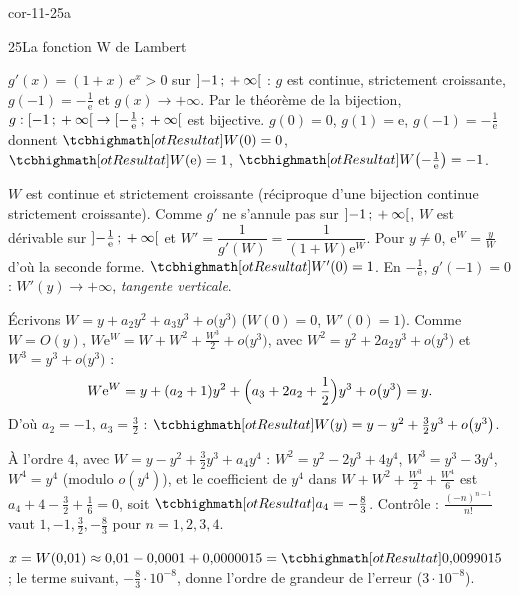 
\begin{blocLivre}{cor-11-25a}
\begin{corrige}{25}{La fonction W de Lambert}
\begin{questions}
  \item $g'(x)=(1+x)\,\mathrm{e}^{x}>0$ sur $\mathopen{]}-1\,{;}\,+\infty\mathclose{[}$ : $g$ est
    continue, strictement croissante, $g(-1)=-\frac1{\mathrm{e}}$ et
    $g(x)\to+\infty$. Par le théorème de la bijection,
    $g:\mathopen{[}-1\,{;}\,+\infty\mathclose{[}\to\mathopen{[}-\frac1{\mathrm{e}}\,{;}\,+\infty\mathclose{[}$ est
    bijective. $g(0)=0$, $g(1)=\mathrm{e}$, $g(-1)=-\frac1{\mathrm{e}}$
    donnent $\res{W(0)=0}$, $\res{W(\mathrm{e})=1}$,
    $\res{W\bigl(-\tfrac1{\mathrm{e}}\bigr)=-1}$.
  \item $W$ est continue et strictement croissante (réciproque d'une
    bijection continue strictement croissante). Comme $g'$ ne s'annule pas
    sur $\mathopen{]}-1\,{;}\,+\infty\mathclose{[}$, $W$ est dérivable sur
    $\mathopen{]}-\frac1{\mathrm{e}}\,{;}\,+\infty\mathclose{[}$ et
    $W'=\dfrac{1}{g'(W)}=\dfrac{1}{(1+W)\mathrm{e}^{W}}$. Pour $y\neq0$,
    $\mathrm{e}^{W}=\frac yW$ d'où la seconde forme. $\res{W'(0)=1}$. En
    $-\frac1{\mathrm{e}}$, $g'(-1)=0$ : $W'(y)\to+\infty$, \emph{tangente
    verticale}.
\end{questions}
\begin{questions}[resume]
  \item Écrivons $W=y+a_2y^{2}+a_3y^{3}+o\bigl(y^{3}\bigr)$ ($W(0)=0$,
    $W'(0)=1$). Comme $W=O(y)$,
    $W\mathrm{e}^{W}=W+W^{2}+\frac{W^{3}}{2}+o\bigl(y^{3}\bigr)$, avec
    $W^{2}=y^{2}+2a_2y^{3}+o\bigl(y^{3}\bigr)$ et $W^{3}=y^{3}+o\bigl(y^{3}\bigr)$ :
    \[
    W\mathrm{e}^{W}=y+(a_2+1)y^{2}+\Bigl(a_3+2a_2+\frac12\Bigr)y^{3}+o\bigl(y^{3}\bigr)=y .
    \]
    D'où $a_2=-1$, $a_3=\frac32$ :
    $\res{W(y)=y-y^{2}+\tfrac32y^{3}+o\bigl(y^{3}\bigr)}$.
  \item À l'ordre $4$, avec $W=y-y^{2}+\frac32y^{3}+a_4y^{4}$ :
    $W^{2}=y^{2}-2y^{3}+4y^{4}$, $W^{3}=y^{3}-3y^{4}$, $W^{4}=y^{4}$
    (modulo $o(y^{4})$), et le coefficient de $y^{4}$ dans
    $W+W^{2}+\frac{W^{3}}2+\frac{W^{4}}6$ est
    $a_4+4-\frac32+\frac16=0$, soit $\res{a_4=-\tfrac83}$. Contrôle :
    $\frac{(-n)^{n-1}}{n!}$ vaut $1,-1,\frac32,-\frac83$ pour
    $n=1,2,3,4$.
  \item $x=W(0{,}01)\approx0{,}01-0{,}0001+0{,}0000015=\res{0{,}0099015}$ ;
    le terme suivant, $-\frac83\cdot10^{-8}$, donne l'ordre de grandeur de
    l'erreur ($3\cdot10^{-8}$).
\end{questions}
\end{corrige}
\end{blocLivre}

